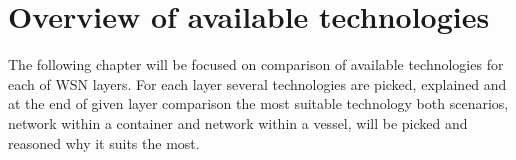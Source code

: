 \section{Overview of available technologies} \label{sec:technologies}
The following chapter will be focused on comparison of available technologies for each of WSN layers. For each layer several technologies are picked, explained and at the end of given layer comparison the most suitable technology both scenarios, network within a container and network within a vessel, will be picked and reasoned why it suits the most.